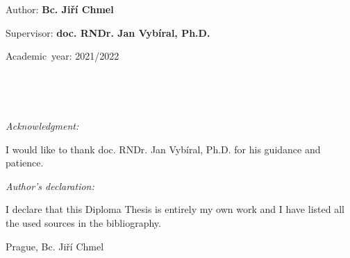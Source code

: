 \documentclass[11pt,oneside,czech,american]{book} %
\theoremstyle{plain}
\theoremstyle{definition}
\newenvironment{lyxlist}[1]
{\begin{list}{}
		{\settowidth{\labelwidth}{#1}
			\setlength{\leftmargin}{\labelwidth}
			\addtolength{\leftmargin}{\labelsep}
			\renewcommand{\makelabel}[1]{##1\hfil}}}
	{\end{list}}
\begin{document}
\vfill{}

\begin{lyxlist}{MMMMMMMMM}
	\begin{singlespace}
		\item [{Author:}] \textbf{Bc. Jiří Chmel}
		\item [{Supervisor:}] \textbf{doc. RNDr. Jan Vybíral, Ph.D.}
	\end{singlespace}
	
	\begin{singlespace}
		\item [{Academic~year:}] 2021/2022
	\end{singlespace}
\end{lyxlist}
\newpage{}


~



%
%
%
%
%
%
%
%
%
%
~\newpage{}

\noindent \emph{\Large{}Acknowledgment:}{\Large \par}

\noindent I would like to thank doc. RNDr. Jan Vybíral, Ph.D.
for his guidance and patience.

\vfill

\noindent \emph{\Large{}Author's declaration:}{\Large \par}

\noindent I declare that this Diploma Thesis is entirely
my own work and I have listed all the used sources in the bibliography.

\bigskip{}


\noindent Prague, \documentdate \hfill{}Bc. Jiří Chmel

\vspace{2cm}

\newpage{}
\end{document}

